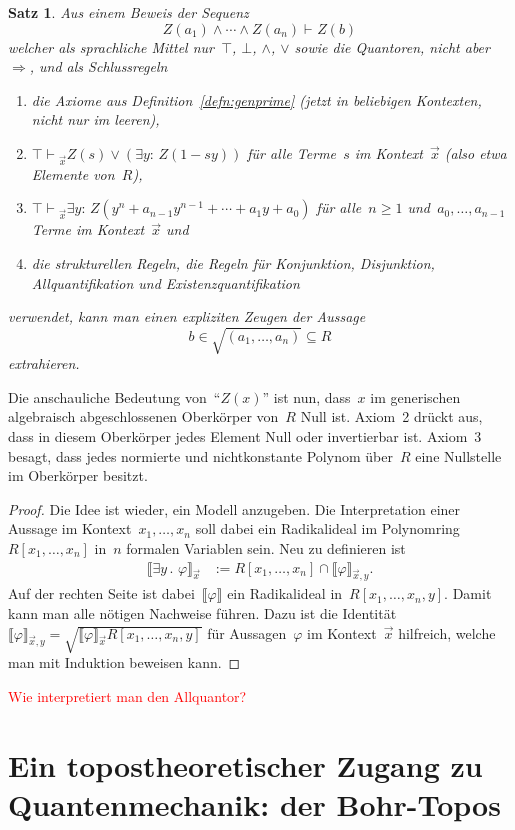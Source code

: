 \documentclass[a4paper,ngerman,12pt]{scrartcl}
\theoremstyle{definition}
\theoremstyle{plain}
\newtheorem{satz}[defn]{Satz}
\theoremstyle{remark}
\newcommand{\brak}[1]{\llbracket {#1} \rrbracket}
\newcommand{\seq}[1]{\mathrel{\vdash\!\!\!_{#1}}}
\renewcommand{\_}{\mathpunct{.}\,}
\newcommand{\?}{\,{:}\,}
\newcommand{\XXX}[1]{\textcolor{red}{#1}}
\begin{document}
\begin{satz}
Aus einem Beweis der Sequenz
\[ Z(a_1) \wedge \cdots \wedge Z(a_n) \seq{} Z(b) \]
welcher als sprachliche Mittel nur~$\top$, $\bot$, $\wedge$, $\vee$ sowie die
Quantoren, nicht aber~$\Rightarrow$, und als Schlussregeln
\begin{enumerate}
\item[1.] die Axiome aus Definition~\ref{defn:genprime} (jetzt in beliebigen
Kontexten, nicht nur im leeren),
\item[2.] $\top \seq{\vec x} Z(s) \vee (\exists y{:}\, Z(1-sy))$ für alle
Terme~$s$ im Kontext~$\vec x$ (also etwa Elemente von~$R$),
\item[3.] $\top \seq{\vec x} \exists y{:}\, Z(y^n + a_{n-1}y^{n-1} + \cdots +
a_1y + a_0)$ für alle~$n \geq 1$ und~$a_0,\ldots,a_{n-1}$ Terme im
Kontext~$\vec x$ und
\item[4.] die strukturellen Regeln, die Regeln für Konjunktion, Disjunktion,
Allquantifikation und Existenzquantifikation
\end{enumerate}
verwendet, kann man einen expliziten Zeugen der Aussage
\[ b \in \sqrt{(a_1,\ldots,a_n)} \subseteq R \]
extrahieren.
\end{satz}
Die anschauliche Bedeutung von~"`$Z(x)$"' ist nun, dass~$x$ im generischen
algebraisch abgeschlossenen Oberkörper von~$R$ Null ist. Axiom~2 drückt aus,
dass in diesem Oberkörper jedes Element Null oder invertierbar ist. Axiom~3
besagt, dass jedes normierte und nichtkonstante Polynom über~$R$ eine
Nullstelle im Oberkörper besitzt.
\begin{proof}Die Idee ist wieder, ein Modell anzugeben. Die
Interpretation einer Aussage im Kontext~$x_1,\ldots,x_n$ soll dabei ein
Radikalideal im Polynomring~$R[x_1,\ldots,x_n]$ in~$n$ formalen Variablen sein.
Neu zu definieren ist
\begin{align*}
  \brak{\exists y\_ \varphi}_{\vec x} &:= R[x_1,\ldots,x_n] \cap \brak{\varphi}_{\vec x,y}.
\end{align*}
Auf der rechten Seite ist dabei~$\brak{\varphi}$ ein Radikalideal
in~$R[x_1,\ldots,x_n,y]$. Damit kann man alle nötigen Nachweise führen.
Dazu ist die Identität~$\brak{\varphi}_{\vec x,y} =
\sqrt{\brak{\varphi}_{\vec x} R[x_1,\ldots,x_n,y]}$ für Aussagen~$\varphi$ im Kontext~$\vec x$
hilfreich, welche man mit Induktion beweisen kann.
\end{proof}
\XXX{Wie interpretiert man den Allquantor?}


\section{Ein topostheoretischer Zugang zu Quantenmechanik: der Bohr-Topos}
\label{qm-topos}
\end{document}
